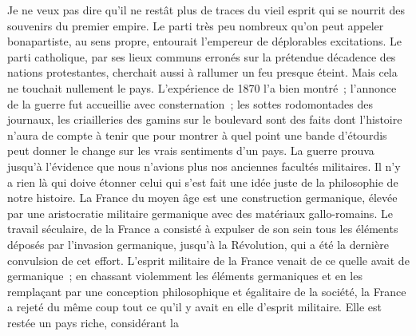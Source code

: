 \documentclass[french,twoside]{book} %
\begin{document}
Je ne veux pas dire qu’il ne restât plus de traces du vieil esprit qui se nourrit des souvenirs du premier empire. Le parti très peu nombreux qu’on peut appeler bonapartiste, au sens propre, entourait l’empereur de déplorables excitations. Le parti catholique, par ses lieux communs erronés sur la prétendue décadence des nations protestantes, cherchait aussi à rallumer un feu presque éteint. Mais cela ne touchait nullement le pays. L’expérience de 1870 l’a bien montré ; l’annonce de la guerre fut accueillie avec consternation ; les sottes rodomontades des journaux, les criailleries des gamins sur le boulevard sont des faits dont l’histoire n’aura de compte à tenir que pour montrer à quel point une bande d’étourdis peut donner le change sur les vrais sentiments d’un pays. La guerre prouva jusqu’à l’évidence que nous n’avions plus nos anciennes facultés militaires. Il n’y a rien là qui doive étonner celui qui s’est fait une idée juste de la philosophie de notre histoire. La France du moyen âge est une construction germanique, élevée par une aristocratie militaire germanique avec des matériaux gallo-romains. Le travail séculaire, de la France a consisté à expulser de son sein tous les éléments déposés par l’invasion germanique, jusqu’à la Révolution, qui a été la dernière convulsion de cet effort. L’esprit militaire de la France venait de ce quelle avait de germanique ; en chassant violemment les éléments germaniques et en les remplaçant par une conception philosophique et égalitaire de la société, la France a rejeté du même coup tout ce qu’il y avait en elle d’esprit militaire. Elle est restée un pays riche, considérant la\par
\end{document}
